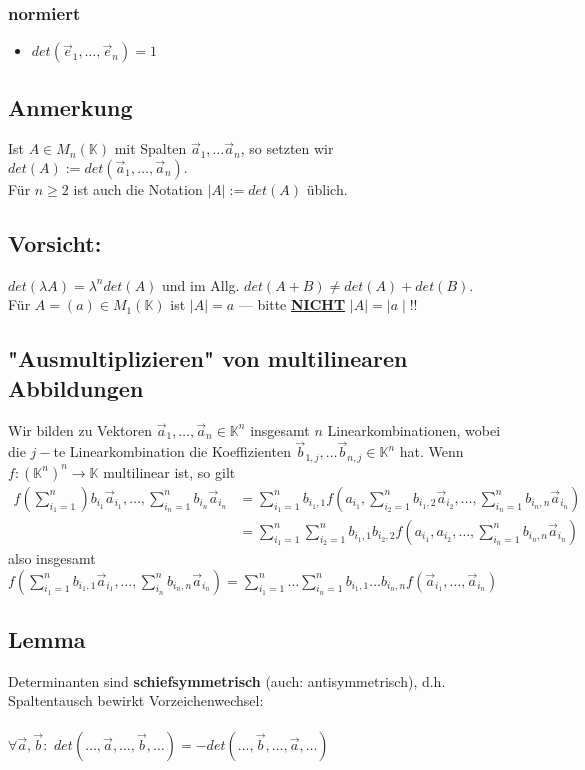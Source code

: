 \documentclass[titlepage]{article}
\newcommand{\K}{\mathbb{K}}
\newcommand{\1}{\mathbb{1}}
\newcommand{\0}{\mathbb{0}}
\begin{document}
				\subsubsection{normiert}
					\begin{itemize}
						\item $det(\vec{e}_1,\dots,\vec{e}_n)=1$
					\end{itemize}
				\subsection{Anmerkung}
					Ist $A\in M_n(\K)$ mit Spalten $\vec{a}_1,\dots\vec{a}_n$, so setzten wir $det(A):=det(\vec{a}_1,\dots,\vec{a}_n).$\\
					Für $n\ge2$ ist auch die Notation $\mid A\mid:=det(A)$ üblich.
			\subsection{Vorsicht:}
				$det(\lambda A)=\lambda^n det(A)$ und im Allg. $det(A+B)\neq det(A)+det(B).$\\
				Für $A=(a)\in M_1(\K)$ ist $\mid A\mid=a $ --- bitte \textbf{\underline{NICHT}} $\mid A\mid=\mid a\mid$!!
			\subsection{"Ausmultiplizieren" von multilinearen Abbildungen}
				Wir bilden zu Vektoren $\vec{a}_1,\dots,\vec{a}_n\in\K^n$ insgesamt $n$ Linearkombinationen, wobei die $j-$te Linearkombination die Koeffizienten $\vec{b}_{1,j},\dots\vec{b}_{n,j}\in\K^n$ hat. Wenn $f:(\K^n)^n\rightarrow\K$ multilinear ist, so gilt
				\begin{align*}
					f(\sum^n_{i_1=1})b_{i_1}\vec{a}_{i_1},\dots,\sum^n_{i_n=1}b_{i_n}\vec{a}_{i_n}&=\sum^n_{i_1=1}b_{i_1,1}f(a_{i_1},\sum^n_{i_2=1}b_{i_1,2}\vec{a}_{i_2},\dots,\sum^n_{i_n=1}b_{i_n,n}\vec{a}_{i_n})\\
					&=\sum^n_{i_1=1}\sum^n_{i_2=1}b_{i_1,1}b_{i_2,2}f(a_{i_1},a_{i_2},\dots,\sum^n_{i_n=1}b_{i_n,n}\vec{a}_{i_n})
				\end{align*}
				also insgesamt $f(\sum\limits^n_{i_1=1}b_{i_1,1}\vec{a}_{i_1},\dots,\sum\limits^n_{i_n}b_{i_n,n}\vec{a}_{i_n})=\sum\limits^n_{i_1=1}\dots\sum\limits^n_{i_n=1}b_{i_1,1}\dots b_{i_n,n}f(\vec{a}_{i_1},\dots,\vec{a}_{i_n})$
			\subsection{Lemma}
				Determinanten sind \textbf{schiefsymmetrisch} (auch: antisymmetrisch), d.h. Spaltentausch bewirkt Vorzeichenwechsel:\\\\ $\forall\vec{a},\vec{b}:$ $det(\dots,\vec{a},\dots,\vec{b},\dots)=-det(\dots,\vec{b},\dots,\vec{a},\dots)$
\end{document}
